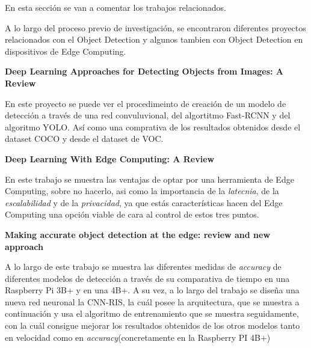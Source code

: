 
En esta sección se van a comentar los trabajos relacionados.

A lo largo del proceso previo de investigación, se encontraron diferentes proyectos relacionados con el Object Detection y algunos tambien con Object Detection en dispositivos de Edge Computing.

\begin{list}{\textbullet}{ %
    \addtolength{\itemsep}{-2mm} %
    \setlength{\itemindent}{2mm}}
    \item \textbf{Deep Learning Approaches for Detecting Objects from Images: A Review} \cite{Pathak2018}
    
    En este proyecto se puede ver el procedimeinto de creación de un modelo de detección a través de una red convuluvional, del algortitmo Fast-RCNN y del algoritmo YOLO.
    Así como una comprativa de los resultados obtenidos desde el dataset COCO y desde el dataset de VOC.
    \item \textbf{Deep Learning With Edge Computing: A Review} \cite{Chen2019}
    
    En este trabajo se muestra las ventajas de optar por una herramienta de Edge Computing, sobre no hacerlo, asi como la importancia de la \textit{latecnia}, de la \textit{escalabilidad} y de la \textit{privacidad}, ya que estás características hacen del Edge Computing una opción viable de cara al control de estos tres puntos.

    \item \textbf{Making accurate object detection at the edge: review and new approach} \cite{Huang2021}
    
    A lo largo de este trabajo se muestra las diferentes medidas de \textit{accuracy} de diferentes modelos de detección a través de su comparativa de tiempo en una Raspberry Pi 3B+ y en una 4B+. A su vez, a lo largo del trabajo se diseña una nueva red neuronal la CNN-RIS, la cuál posee la arquitectura, que se muestra a continuación y usa el algoritmo de entrenamiento que se muestra seguidamente, con la cuál consigue mejorar los resultados obtenidos de los otros modelos tanto en velocidad como en \textit{accuracy}(concretamente en la Raspberry PI 4B+)
\end{list}
